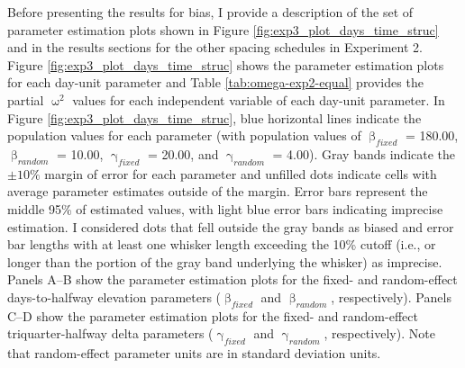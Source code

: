 \documentclass[
12pt, %
twoside,
english]{guelphthesis}
\theoremstyle{definition}
\theoremstyle{definition}
\theoremstyle{definition}
\theoremstyle{definition}
\theoremstyle{remark}
\begin{document}
Before presenting the results for bias, I provide a description of the set of parameter estimation plots shown in Figure \ref{fig:exp3_plot_days_time_struc} and in the results sections for the other spacing schedules in Experiment 2. Figure \ref{fig:exp3_plot_days_time_struc} shows the parameter estimation plots for each day-unit parameter and Table \ref{tab:omega-exp2-equal} provides the partial \(\upomega^2\) values for each independent variable of each day-unit parameter. In Figure \ref{fig:exp3_plot_days_time_struc}, blue horizontal lines indicate the population values for each parameter (with population values of \(\upbeta_{fixed}\) = 180.00, \(\upbeta_{random}\) = 10.00, \(\upgamma_{fixed}\) = 20.00, and \(\upgamma_{random}\) = 4.00). Gray bands indicate the \(\pm 10\%\) margin of error for each parameter and unfilled dots indicate cells with average parameter estimates outside of the margin. Error bars represent the middle 95\% of estimated values, with light blue error bars indicating imprecise estimation. I considered dots that fell outside the gray bands as biased and error bar lengths with at least one whisker length exceeding the 10\% cutoff (i.e., or longer than the portion of the gray band underlying the whisker) as imprecise. Panels A--B show the parameter estimation plots for the fixed- and random-effect days-to-halfway elevation parameters (\(\upbeta_{fixed}\) and \(\upbeta_{random}\), respectively). Panels C--D show the parameter estimation plots for the fixed- and random-effect triquarter-halfway delta parameters (\(\upgamma_{fixed}\) and \(\upgamma_{random}\), respectively). Note that random-effect parameter units are in standard deviation units.
\end{document}
